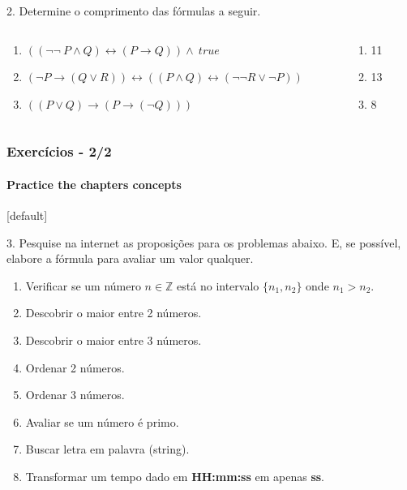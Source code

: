 \documentclass[10pt, headsepline, captions=tableabove,xcolor=table]{beamer}
\begin{document}
\begin{frame}[t]
\begin{exampleblock}{2. Determine o comprimento das fórmulas a seguir.}
\begin{columns}[T]
\begin{column}{0.8\textwidth}
                \begin{enumerate}[\bf a.]
                    \item $((\lnot \lnot~P \land Q) \leftrightarrow (P \rightarrow Q)) \land~true$
                    \item $(\lnot P \rightarrow (Q \lor R)) \leftrightarrow ((P \land Q) \leftrightarrow (\lnot \lnot R \lor \lnot P))$
                    \item $((P \lor Q) \rightarrow (P \rightarrow (\lnot Q)))$
                \end{enumerate}
            \end{column}
            \pause
            \begin{column}{0.2\textwidth}
                \begin{enumerate}[\bf a.]
                    \item 11
                    \item 13
                    \item 8
                \end{enumerate}
            \end{column}
        \end{columns}
    \end{exampleblock}
\end{frame}
%
\begin{frame}[t] %
    \frametitle{Exercícios - 2/2}
    \framesubtitle{Practice the chapters concepts}
    \small
    [default]
    \begin{exampleblock}{3. Pesquise na internet as proposições para os problemas abaixo.}
        E, se possível, elabore a fórmula para avaliar um valor qualquer.\\
        \begin{enumerate}[\bf P1.]
            \item Verificar se um número $n \in \mathbb{Z} $ está no intervalo $\{n_1, n_2\}$ onde $n_1 > n_2$.
            \item Descobrir o maior entre 2 números.
            \item Descobrir o maior entre 3 números.
            \item Ordenar 2 números.
            \item Ordenar 3 números.
            \item Avaliar se um número é primo.
            \item Buscar letra em palavra (string).
            \item Transformar um tempo dado em \textbf{HH:mm:ss} em apenas \textbf{ss}.
        \end{enumerate}
    \end{exampleblock}
    \normalsize
    \end{frame}
%
%
\end{document}
